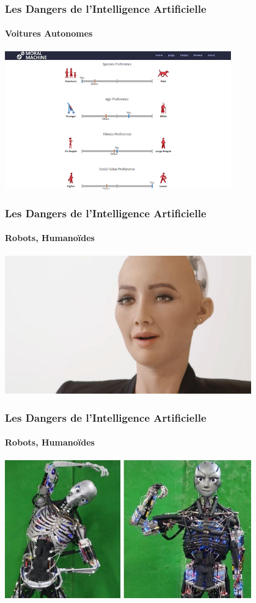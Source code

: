 \documentclass{beamer}
\begin{document}
	\begin{frame}
	\frametitle{Les Dangers de l'Intelligence Artificielle}
	\framesubtitle{Voitures Autonomes}
	\centerline{\includegraphics[height=6cm]{MIT2.png}}
	\end{frame}
	
	\begin{frame}
	\frametitle{Les Dangers de l'Intelligence Artificielle}
	\framesubtitle{Robots, Humanoïdes}
	\centerline{\includegraphics[height=6cm]{robotSophia.jpeg}}
	\end{frame}
	
	\begin{frame}
	\frametitle{Les Dangers de l'Intelligence Artificielle}
	\framesubtitle{Robots, Humanoïdes}
	\centerline{\includegraphics[height=6cm]{kenshiro_kengoro.jpg}}
	\end{frame}
	
\end{document}
